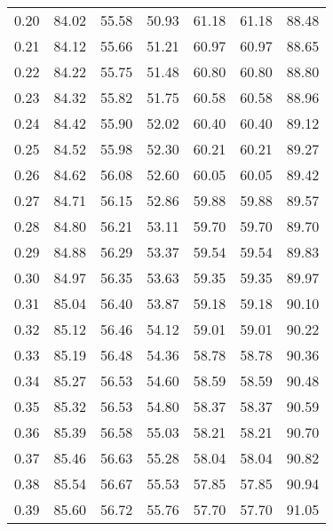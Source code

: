 \begin{tabular}{|c|c|c|c|c|c|c|}
      0.20 &     84.02 &     55.58 &      50.93 &   61.18 &      61.18 &         88.48 \\
      0.21 &     84.12 &     55.66 &      51.21 &   60.97 &      60.97 &         88.65 \\
      0.22 &     84.22 &     55.75 &      51.48 &   60.80 &      60.80 &         88.80 \\
      0.23 &     84.32 &     55.82 &      51.75 &   60.58 &      60.58 &         88.96 \\
      0.24 &     84.42 &     55.90 &      52.02 &   60.40 &      60.40 &         89.12 \\
      0.25 &     84.52 &     55.98 &      52.30 &   60.21 &      60.21 &         89.27 \\
      0.26 &     84.62 &     56.08 &      52.60 &   60.05 &      60.05 &         89.42 \\
      0.27 &     84.71 &     56.15 &      52.86 &   59.88 &      59.88 &         89.57 \\
      0.28 &     84.80 &     56.21 &      53.11 &   59.70 &      59.70 &         89.70 \\
      0.29 &     84.88 &     56.29 &      53.37 &   59.54 &      59.54 &         89.83 \\
      0.30 &     84.97 &     56.35 &      53.63 &   59.35 &      59.35 &         89.97 \\
      0.31 &     85.04 &     56.40 &      53.87 &   59.18 &      59.18 &         90.10 \\
      0.32 &     85.12 &     56.46 &      54.12 &   59.01 &      59.01 &         90.22 \\
      0.33 &     85.19 &     56.48 &      54.36 &   58.78 &      58.78 &         90.36 \\
      0.34 &     85.27 &     56.53 &      54.60 &   58.59 &      58.59 &         90.48 \\
      0.35 &     85.32 &     56.53 &      54.80 &   58.37 &      58.37 &         90.59 \\
      0.36 &     85.39 &     56.58 &      55.03 &   58.21 &      58.21 &         90.70 \\
      0.37 &     85.46 &     56.63 &      55.28 &   58.04 &      58.04 &         90.82 \\
      0.38 &     85.54 &     56.67 &      55.53 &   57.85 &      57.85 &         90.94 \\
      0.39 &     85.60 &     56.72 &      55.76 &   57.70 &      57.70 &         91.05 \\

\end{tabular}
